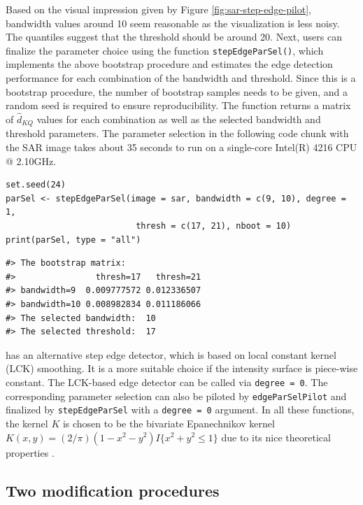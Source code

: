 Based on the visual impression given by Figure \ref{fig:sar-step-edge-pilot}, bandwidth values around 10 seem reasonable as the visualization is less noisy. The quantiles suggest that the threshold should be around 20. Next, users can finalize the parameter choice using the function \texttt{stepEdgeParSel()}, which implements the above bootstrap procedure and estimates the edge detection performance for each combination of the bandwidth and threshold. Since this is a bootstrap procedure, the number of bootstrap samples needs to be given, and a random seed is required to ensure reproducibility. The function returns a matrix of \(\widehat{d}_{KQ}\) values for each combination as well as the selected bandwidth and threshold parameters. The parameter selection in the following code chunk with the SAR image takes about 35 seconds to run on a single-core Intel(R) 4216 CPU @ 2.10GHz.

\begin{verbatim}
set.seed(24)
parSel <- stepEdgeParSel(image = sar, bandwidth = c(9, 10), degree = 1, 
                          thresh = c(17, 21), nboot = 10)
print(parSel, type = "all")
\end{verbatim}

\begin{verbatim}
#> The bootstrap matrix:
#>                thresh=17   thresh=21
#> bandwidth=9  0.009777572 0.012336507
#> bandwidth=10 0.008982834 0.011186066
#> The selected bandwidth:  10 
#> The selected threshold:  17
\end{verbatim}

 has an alternative step edge detector, which is based on local constant kernel (LCK) smoothing. It is a more suitable choice if the intensity surface is piece-wise constant. The LCK-based edge detector can be called via \texttt{degree\ =\ 0}. The corresponding parameter selection can also be piloted by \texttt{edgeParSelPilot} and finalized by \texttt{stepEdgeParSel} with a \texttt{degree\ =\ 0} argument. In all these functions, the kernel \(K\) is chosen to be the bivariate Epanechnikov kernel \(K(x, y) = (2/\pi)(1 - x^2 - y^2)I\{x^2 + y^2 \leq 1 \}\) due to its nice theoretical properties \citep{fan2018local}.

\subsection{Two modification procedures}\label{sec:JLC.MPs}

